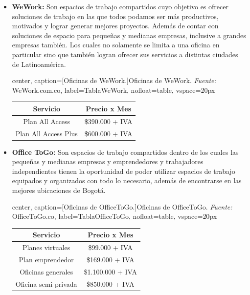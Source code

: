 \begin{itemize}
	\item \textbf{WeWork:} Son espacios de trabajo compartidos cuyo objetivo es ofrecer soluciones de trabajo en las que todos podamos ser más productivos, motivados y lograr generar mejores proyectos. Además de contar con soluciones de espacio para pequeñas y medianas empresas, inclusive a grandes empresas también. Los cuales no solamente se limita a una oficina en particular sino que también logran ofrecer sus servicios a distintas ciudades de Latinoamérica.
	
	\begin{adjustbox}{
			center,
			caption=[{Oficinas de WeWork.}]{\centering Oficinas de WeWork. \textit{Fuente:} WeWork.com.co},
			label={TablaWeWork},
			nofloat=table, vspace={20px}}
			\begin{tabular}{|c|c|}
				\hline
				\rowcolor[HTML]{D9EAD3} 
				\textbf{Servicio} & \textbf{Precio x Mes} \\ \hline
				Plan All Access & \$390.000 + IVA \\ \hline
				Plan All Access Plus & \$600.000 + IVA \\ \hline
			\end{tabular}
	\end{adjustbox}
	
	\item \textbf{Office ToGo:} Son espacios de trabajo compartidos dentro de los cuales las pequeñas y medianas empresas y emprendedores y trabajadores independientes tienen la oportunidad de poder utilizar espacios de trabajo equipados y organizados con todo lo necesario, además de encontrarse en las mejores ubicaciones de Bogotá.
	
	\begin{adjustbox}{
			center,
			caption=[{Oficinas de OfficeToGo.}]{\centering Oficinas de OfficeToGo. \textit{Fuente:} OfficeToGo.co},
			label={TablaOfficeToGo},
			nofloat=table, vspace={20px}}
			\begin{tabular}{|c|c|}
				\hline
				\rowcolor[HTML]{D9EAD3} 
				\textbf{Servicio} & \textbf{Precio x Mes} \\ \hline
				Planes virtuales & \$99.000 + IVA \\ \hline
				Plan emprendedor & \$169.000 + IVA \\ \hline
				Oficinas generales & \$1.100.000 + IVA \\ \hline
				Oficina semi-privada & \$850.000 + IVA \\ \hline
			\end{tabular}
	\end{adjustbox}
	

\end{itemize}

